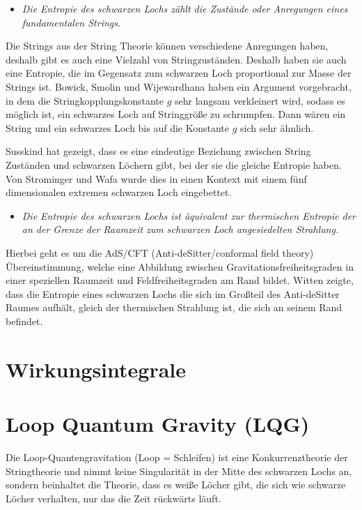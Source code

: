 \documentclass[ngerman]{scrartcl}
\begin{document}
	\begin{itemize}
		\item [~] \textit{Die Entropie des schwarzen Lochs zählt die Zustände oder Anregungen eines fundamentalen Strings.}
	\end{itemize}
	Die Strings aus der String Theorie können verschiedene Anregungen haben, deshalb gibt es auch eine Vielzahl von Stringzuständen. Deshalb haben sie auch eine Entropie, die im Gegensatz zum schwarzen Loch proportional zur Masse der Strings ist. Bowick, Smolin und Wijewardhana \cite{BowickSmolinWijewardhana} haben ein Argument vorgebracht, in dem die Stringkopplungskonstante $g$ sehr langsam verkleinert wird, sodass es möglich ist, ein schwarzes Loch auf Stringgröße zu schrumpfen. Dann wären ein String und ein schwarzes Loch bis auf die Konstante $g$ sich sehr ähnlich.
	
	Susskind \cite{Susskind} hat gezeigt, dass es eine eindeutige Beziehung zwischen String Zuständen und schwarzen Löchern gibt, bei der sie die gleiche Entropie haben. Von Strominger und Wafa \cite{StromingerWafa} wurde dies in einen Kontext mit einem fünf dimensionalen extremen schwarzen Loch eingebettet. 
	
	\begin{itemize}
		\item [~] \textit{Die Entropie des schwarzen Lochs ist äquivalent zur thermischen Entropie der an der Grenze der Raumzeit zum schwarzen Loch angesiedelten Strahlung.}
	\end{itemize}
	Hierbei geht es um die AdS/CFT (Anti-deSitter/conformal field theory) Übereinstimmung, welche eine Abbildung zwischen Gravitationsfreiheitsgraden in einer speziellen Raumzeit und Feldfreiheitsgraden am Rand bildet. 
	Witten \cite{Witten} zeigte, dass die Entropie eines schwarzen Lochs die sich im Großteil des Anti-deSitter Raumes aufhält, gleich der thermischen Strahlung ist, die sich an seinem Rand befindet. 
	
\section{Wirkungsintegrale}

\section{Loop Quantum Gravity (LQG)}	
Die Loop-Quantengravitation (Loop = Schleifen) ist eine Konkurrenztheorie der Stringtheorie und nimmt keine Singularität in der Mitte des schwarzen Lochs an, sondern beinhaltet die Theorie, dass es weiße Löcher gibt, die sich wie schwarze Löcher verhalten, nur das die Zeit rückwärts läuft. 
\end{document}
